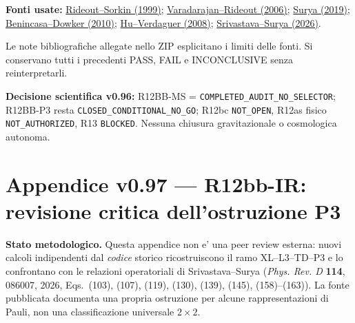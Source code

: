 \documentclass[11pt,a4paper]{article}
\begin{document}
\textbf{Fonti usate:} \href{https://doi.org/10.1103/PhysRevD.61.024002}{Rideout--Sorkin (1999)}; \href{https://doi.org/10.1103/PhysRevD.73.104021}{Varadarajan--Rideout (2006)}; \href{https://doi.org/10.1007/s41114-019-0023-1}{Surya (2019)}; \href{https://doi.org/10.1103/PhysRevLett.104.181301}{Benincasa--Dowker (2010)}; \href{https://doi.org/10.12942/lrr-2008-3}{Hu--Verdaguer (2008)}; \href{https://doi.org/10.1103/thx5-dknv}{Srivastava--Surya (2026)}. \par Le note bibliografiche allegate nello ZIP esplicitano i limiti delle fonti. Si conservano tutti i precedenti PASS, FAIL e INCONCLUSIVE senza reinterpretarli.

\textbf{Decisione scientifica v0.96:} R12BB-MS = \texttt{COMPLETED\_AUDIT\_NO\_SELECTOR}; R12BB-P3 resta \texttt{CLOSED\_CONDITIONAL\_NO\_GO}; R12bc \texttt{NOT\_OPEN}, R12as fisico \texttt{NOT\_AUTHORIZED}, R13 \texttt{BLOCKED}. Nessuna chiusura gravitazionale o cosmologica autonoma.
\endgroup

\clearpage
\begingroup
\setlength{\parskip}{0.13em}
\section*{Appendice v0.97 --- R12bb-IR: revisione critica dell'ostruzione P3}
\textbf{Stato metodologico.} Questa appendice non e' una peer review esterna: nuovi calcoli indipendenti dal \emph{codice} storico ricostruiscono il ramo XL--L3--TD--P3 e lo confrontano con le relazioni operatoriali di Srivastava--Surya (\emph{Phys. Rev. D} \textbf{114}, 086007, 2026, Eqs.~(103), (107), (119), (130), (139), (145), (158)--(163)). La fonte pubblicata documenta una propria ostruzione per alcune rappresentazioni di Pauli, non una classificazione universale $2\times2$.
\end{document}
